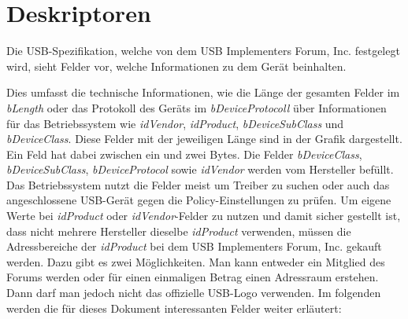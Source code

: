 \newpage
\section{Deskriptoren}\label{Deskriptoren}
Die USB-Spezifikation, welche von dem USB Implementers Forum, Inc.\cite{USBAbout} festgelegt wird, sieht Felder vor, welche Informationen zu dem Gerät beinhalten.


Dies umfasst die technische Informationen, wie die Länge der gesamten Felder im \textit{bLength} oder das Protokoll des Geräts im \textit{bDeviceProtocoll} über Informationen für das Betriebssystem wie \textit{idVendor}, \textit{idProduct}, \textit{bDeviceSubClass} und \textit{bDeviceClass}. Diese Felder mit der jeweiligen Länge sind in der Grafik dargestellt. Ein Feld hat dabei zwischen ein und zwei Bytes. Die Felder \textit{bDeviceClass}, \textit{bDeviceSubClass}, \textit{bDeviceProtocol} sowie \textit{idVendor} werden vom Hersteller befüllt.\cite{USBDesk} Das Betriebssystem nutzt die Felder meist um Treiber zu suchen oder auch das angeschlossene USB-Gerät gegen die Policy-Einstellungen zu prüfen. Um eigene Werte bei \textit{idProduct} oder \textit{idVendor}-Felder zu nutzen und damit sicher gestellt ist, dass nicht mehrere Hersteller dieselbe \textit{idProduct} verwenden, müssen die Adressbereiche der \textit{idProduct} bei dem USB Implementers Forum, Inc. gekauft werden. Dazu gibt es zwei Möglichkeiten. Man kann entweder ein Mitglied des Forums werden oder für einen einmaligen Betrag einen Adressraum erstehen. Dann darf man jedoch nicht das offizielle USB-Logo verwenden. \cite{USBVendor} Im folgenden werden die für dieses Dokument interessanten Felder weiter erläutert:

